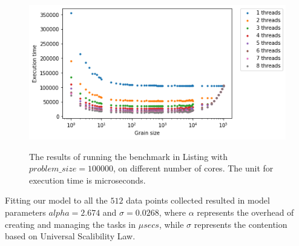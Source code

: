  
\begin{figure}[H]
	\centering
	{\includegraphics[scale=.7]{images/hpx_for_loop/marvin_100000_all.png}}
	\caption{The results of running the benchmark in Listing with $problem\_size=100000$, on different number of cores. The unit for execution time is microseconds.}\label{fig42}		
\end{figure}
\vspace{\baselineskip}

Fitting our model to all the $512$ data points collected resulted in model parameters $alpha=2.674$ and $\sigma=0.0268$, where $\alpha$ represents the overhead of creating and managing the tasks in $\mu{secs}$, while $\sigma$ represents the contention based on Universal Scalibility Law.

